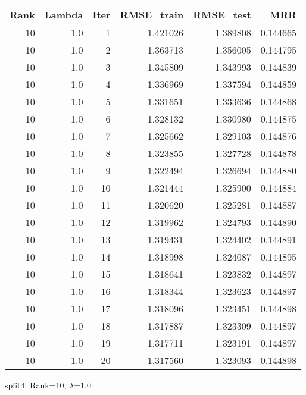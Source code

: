 \begin{tabular}{rrrrrr}
\toprule
 Rank &  Lambda &  Iter &  RMSE\_train &  RMSE\_test &       MRR \\
\midrule
   10 &     1.0 &     1 &    1.421026 &   1.389808 &  0.144665 \\
   10 &     1.0 &     2 &    1.363713 &   1.356005 &  0.144795 \\
   10 &     1.0 &     3 &    1.345809 &   1.343993 &  0.144839 \\
   10 &     1.0 &     4 &    1.336969 &   1.337594 &  0.144859 \\
   10 &     1.0 &     5 &    1.331651 &   1.333636 &  0.144868 \\
   10 &     1.0 &     6 &    1.328132 &   1.330980 &  0.144875 \\
   10 &     1.0 &     7 &    1.325662 &   1.329103 &  0.144876 \\
   10 &     1.0 &     8 &    1.323855 &   1.327728 &  0.144878 \\
   10 &     1.0 &     9 &    1.322494 &   1.326694 &  0.144880 \\
   10 &     1.0 &    10 &    1.321444 &   1.325900 &  0.144884 \\
   10 &     1.0 &    11 &    1.320620 &   1.325281 &  0.144887 \\
   10 &     1.0 &    12 &    1.319962 &   1.324793 &  0.144890 \\
   10 &     1.0 &    13 &    1.319431 &   1.324402 &  0.144891 \\
   10 &     1.0 &    14 &    1.318998 &   1.324087 &  0.144895 \\
   10 &     1.0 &    15 &    1.318641 &   1.323832 &  0.144897 \\
   10 &     1.0 &    16 &    1.318344 &   1.323623 &  0.144897 \\
   10 &     1.0 &    17 &    1.318096 &   1.323451 &  0.144898 \\
   10 &     1.0 &    18 &    1.317887 &   1.323309 &  0.144897 \\
   10 &     1.0 &    19 &    1.317711 &   1.323191 &  0.144897 \\
   10 &     1.0 &    20 &    1.317560 &   1.323093 &  0.144898 \\
\bottomrule
\end{tabular}

\caption{split4: Rank=10, $\lambda$=1.0}
